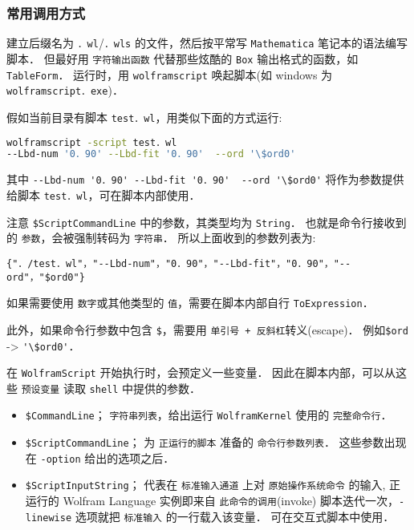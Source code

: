 \subsubsection{常用调用方式}

建立后缀名为 \verb`．wl`/\verb`．wls` 的文件，然后按平常写 \verb`Mathematica` 笔记本的语法编写脚本．
但最好用 \verb`字符输出函数` 代替那些炫酷的 \verb`Box` 输出格式的函数，如 \verb`TableForm`．
运行时，用 \verb`wolframscript` 唤起脚本(如 windows 为 \verb`wolframscript．exe`)．

假如当前目录有脚本 \verb`test．wl`，用类似下面的方式运行:
\begin{lstlisting}[language=bash]
wolframscript -script test．wl  
--Lbd-num '0．90' --Lbd-fit '0．90'  --ord '\$ord0'
\end{lstlisting}

其中 \verb`--Lbd-num '0．90' --Lbd-fit '0．90'  --ord '\$ord0'` 将作为参数提供给脚本 \verb`test．wl`，可在脚本内部使用．

注意 \verb`$ScriptCommandLine` 中的参数，其类型均为 \verb`String`．
也就是命令行接收到的 \verb`参数`，会被强制转码为 \verb`字符串`．
所以上面收到的参数列表为:
\begin{lstlisting}[language=wolfram]
{"．/test．wl"，"--Lbd-num"，"0．90"，"--Lbd-fit"，"0．90"，"--ord"，"$ord0"}
\end{lstlisting}

如果需要使用 \verb`数字`或其他类型的 \verb`值`，需要在脚本内部自行 \verb`ToExpression`．

此外，如果命令行参数中包含 \verb`$`，需要用 \verb`单引号 + 反斜杠`转义(escape)．
例如\verb`$ord` -> \verb`'\$ord0'`．

在 \verb`WolframScript` 开始执行时，会预定义一些变量．
因此在脚本内部，可以从这些 \verb`预设变量` 读取 \verb`shell` 中提供的参数．

\begin{itemize}
\item \verb`$CommandLine`； \verb`字符串列表`，给出运行 \verb`WolframKernel` 使用的 \verb`完整命令行`．
\item \verb`$ScriptCommandLine`； 为 \verb`正运行的脚本` 准备的 \verb`命令行参数列表`．
这些参数出现在 \verb`-option` 给出的选项之后．
\item \verb`$ScriptInputString`； 代表在 \verb`标准输入通道` 上对 \verb`原始操作系统命令` 的输入,
正运行的 Wolfram Language 实例即来自 \verb`此命令的调用`(invoke)
脚本迭代一次，\verb`-linewise` 选项就把 \verb`标准输入` 的一行载入该变量．
可在交互式脚本中使用．
\end{itemize}


